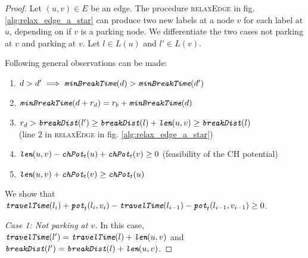 \begin{proof}
	Let $(u,v) \in E$ be an edge. The procedure \textsc{relaxEdge} in fig. \ref{alg:relax_edge_a_star} can produce two new labels at a node $v$ for each label at $u$, depending on if $v$ is a parking node. We differentiate the two cases not parking at $v$ and parking at $v$. Let $l \in L(u)$ and $l' \in L(v)$.

	Following general observations can be made:

	\begin{enumerate}
		\item $d > d' \implies \texttt{\itshape minBreakTime}(d) > \texttt{\itshape minBreakTime}(d')$
		\item $\texttt{\itshape minBreakTime}(d + r_d) = r_b + \texttt{\itshape minBreakTime}(d)$
		\item $r_d > \texttt{\itshape breakDist}(l') \ge \texttt{\itshape breakDist}(l) + \texttt{\itshape len}(u,v) \ge \texttt{\itshape breakDist}(l)$\\(line $2$ in \textsc{relaxEdge} in fig. \ref{alg:relax_edge_a_star})
		\item   $\texttt{\itshape len}(u,v) - \texttt{\itshape chPot}_t(u)+ \texttt{\itshape chPot}_t(v) \ge 0$ (feasibility of the CH potential)
		\item  $\texttt{\itshape len}(u,v) + \texttt{\itshape chPot}_t(v) \ge \texttt{\itshape chPot}_t(u)$
	\end{enumerate}

	We show that $\texttt{\itshape travelTime}(l_i) + \texttt{\itshape pot}_t(l_i,v_i) - \texttt{\itshape travelTime}(l_{i-1}) - \texttt{\itshape pot}_t(l_{i-1},v_{i-1}) \ge 0$.

	\emph{Case 1: Not parking at $v$.} In this case, $\texttt{\itshape travelTime}(l') = \texttt{\itshape travelTime}(l) + \texttt{\itshape len}(u,v)$ and $\texttt{\itshape breakDist}(l') = \texttt{\itshape breakDist}(l) + \texttt{\itshape len}(u,v)$.


\end{proof}
